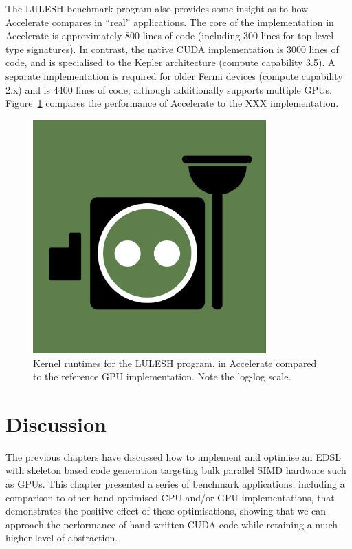 
The LULESH benchmark program also provides some insight as to how Accelerate
compares in ``real'' applications. The core of the implementation in Accelerate
is approximately 800 lines of code (including 300 lines for top-level type
signatures). In contrast, the native CUDA implementation is 3000 lines of code,
and is specialised to the Kepler architecture (compute capability 3.5). A
separate implementation is required for older Fermi devices (compute capability
2.x) and is 4400 lines of code, although additionally supports multiple GPUs.
Figure~\ref{fig:lulesh} compares the performance of Accelerate to the
XXX implementation.

\begin{figure}
    \centering
    \includegraphics[width=0.8\textwidth]{images/misc/placeholder}
    \caption[LULESH kernel benchmarks]{Kernel runtimes for the LULESH program,
    in Accelerate compared to the reference GPU implementation. Note the log-log
    scale.}
\label{fig:lulesh}
\end{figure}


\section{Discussion}

The previous chapters have discussed how to implement and optimise an EDSL with
skeleton based code generation targeting bulk parallel SIMD hardware such as
GPUs. This chapter presented a series of benchmark applications, including a
comparison to other hand-optimised CPU and/or GPU implementations, that
demonstrates the positive effect of these optimisations, showing that we can
approach the performance of hand-written CUDA code while retaining a much higher
level of abstraction.



